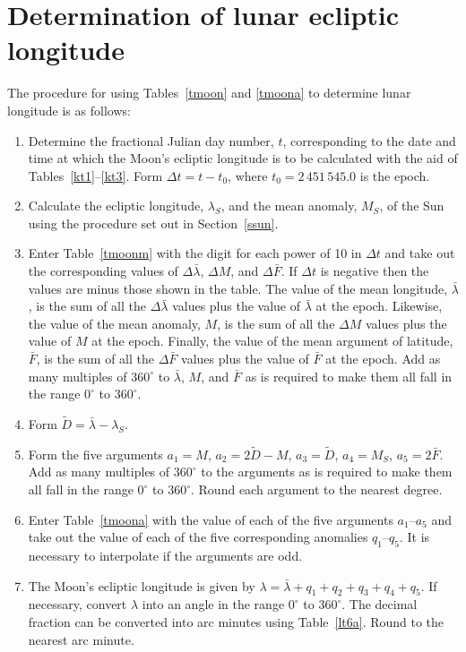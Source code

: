 \section{Determination of lunar ecliptic longitude}
The procedure for using Tables~\ref{tmoon} and \ref{tmoona} to determine lunar longitude is as follows:
\begin{enumerate}
 
 \item Determine the fractional Julian day number, $t$, corresponding to the date and time
at which the Moon's ecliptic longitude is to be calculated with the aid of Tables~\ref{kt1}--\ref{kt3}. Form $\Delta t = t-t_0$, where $t_0=2\,451\,545.0$ is the epoch. 

\item Calculate the ecliptic longitude, $\lambda_S$, and the mean anomaly, $M_S$, of the
Sun using the procedure set out in Section~\ref{ssun}.

\item Enter Table~\ref{tmoonm} with the digit for each power of 10
in ${\Delta} t$ and take out the corresponding values of $\Delta\bar{\lambda}$, $\Delta M$,
and $\Delta\bar{F}$. If $\Delta t$ is negative then the 
values are minus those shown in the table.
The value of the mean longitude, $\bar{\lambda}$, is the
sum of all the $\Delta\bar{\lambda}$ values plus the value of $\bar{\lambda}$ at the epoch. Likewise, the value of the mean anomaly, $M$, is
the sum of all the $\Delta M$ values plus the value of $M$ at the epoch. Finally, the value of the mean argument of latitude, $\bar{F}$, is the
sum of all the $\Delta\bar{F}$ values plus the value of $\bar{F}$ at the epoch. 
Add as many multiples of $360^\circ$ to $\bar{\lambda}$, $M$, and $\bar{F}$
as is required to make them all fall in the range $0^\circ$ to $360^\circ$. 

\item Form $\tilde{D}=\bar{\lambda}-\lambda_S$. 

\item Form the five arguments $a_1=M$, $a_2=2\tilde{D} - M$, $a_3=\tilde{D}$, $a_4 = M_S$, $a_5=2\bar{F}$. Add as
many multiples of $360^\circ$ to the arguments as is required to make them all fall in the range
$0^\circ$ to $360^\circ$. Round each argument to the nearest degree.

\item Enter Table~\ref{tmoona} with the value of each of the five arguments $a_1$--$a_5$ and take out the
value of each of the five corresponding  anomalies $q_1$--$q_5$. It is necessary to interpolate if the arguments are odd.

\item The Moon's ecliptic longitude is given by $\lambda=\bar{\lambda} + q_1+q_2+q_3+q_4+q_5$.
If necessary, convert $\lambda$ into an angle in the range $0^\circ$ to $360^\circ$. 
The decimal fraction can be converted into arc minutes
using Table~\ref{lt6a}. Round to the nearest arc minute. 
\end{enumerate}

